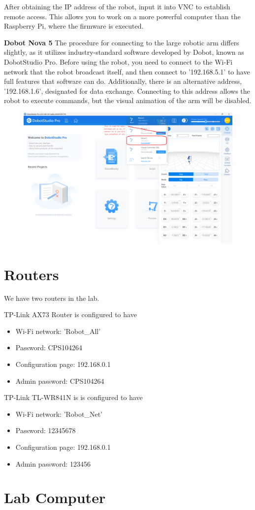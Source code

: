 \documentclass[hidelinks]{article}
\begin{document}
After obtaining the IP address of the robot, input it into VNC to establish remote access. This allows you to work on a more powerful computer than the Raspberry Pi, where the firmware is executed.

\textbf{Dobot Nova 5}
The procedure for connecting to the large robotic arm differs slightly, as it utilizes industry-standard software developed by Dobot, known as DobotStudio Pro. Before using the robot, you need to connect to the Wi-Fi network that the robot broadcast itself, and then connect to '192.168.5.1' to have full features that software can do. Additionally, there is an alternative address, '192.168.1.6', designated for data exchange. Connecting to this address allows the robot to execute commands, but the visual animation of the arm will be disabled.
\begin{figure}[H]
    \centering
    \includegraphics[width=0.8\linewidth]{Figures/dobot_gui.png}
\end{figure}

\newpage
\section*{Routers}
We have two routers in the lab. 

\begin{minipage}[t]{0.5\linewidth}
    TP-Link AX73 Router is configured to have 
    \begin{itemize}
        \item Wi-Fi network: 'Robot\_All'
        \item Password: CPS104264 
        \item Configuration page: 192.168.0.1
        \item Admin password: CPS104264
    \end{itemize}
\end{minipage}%
\begin{minipage}[t]{0.5\linewidth}
    TP-Link TL-WR841N is is configured to have 
    \begin{itemize}
        \item Wi-Fi network: 'Robot\_Net'
        \item Password: 12345678 
        \item Configuration page: 192.168.0.1
        \item Admin password: 123456
    \end{itemize}
\end{minipage}


\section*{Lab Computer}
\end{document}
